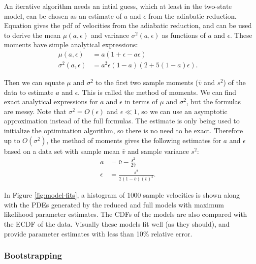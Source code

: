 An iterative algorithm needs an intial guess, which at least in the
two-state model, can be chosen as an estimate of $a$ and $\epsilon$
from the adiabatic reduction. Equation  gives the
pdf of velocities from the adiabatic reduction, and can be used to
derive the mean $\mu(a, \epsilon)$ and variance $\sigma^2(a,
\epsilon)$ as functions of $a$ and $\epsilon$. These moments have
simple analytical expressions: 
\begin{align}
  \label{eq:mean-ar}
  \mu(a, \epsilon) &= a(1 + \epsilon - a \epsilon) \\
  \label{eq:var-ar}
  \sigma^2(a, \epsilon) &= a^2 \epsilon (1 - a) (2 + 5(1 - a) \epsilon).
\end{align}

Then we can equate $\mu$ and $\sigma^2$ to the first two sample
moments ($\bar{v}$ and $s^2$) of the data to estimate $a$ and
$\epsilon$. This is called the method of moments. We can find exact
analytical expressions for $a$ and $\epsilon$ in terms of $\mu$ and
$\sigma^2$, but the formulas are messy. Note that
$\sigma^2 = O(\epsilon)$ and $\epsilon \ll 1$, so we can use an
asymptotic approximation instead of the full formulas. The estimate is
only being used to initialize the optimization algorithm, so there is
no need to be exact. Therefore up to $O(\sigma^2)$, the method of
moments gives the following estimates for $a$ and $\epsilon$ based on
a data set with sample mean $\bar{v}$ and sample variance $s^2$:
\begin{align}
  \label{eq:mean-est}
  a &= \bar{v} - \frac{s^2}{2\bar{v}} \\
  \label{eq:var-est}
  \epsilon &= \frac{s^2}{2(1 - \bar{v})(\bar{v})^2}.
\end{align}

In Figure \ref{fig:model-fits}, a histogram of 1000 sample velocities
is shown along with the PDEs generated by the reduced and full models
with maximum likelihood parameter estimates. The CDFs of the models
are also compared with the ECDF of the data. Visually these models fit
well (as they should), and provide parameter estimates with less than
10\% relative error.

\subsubsection{Bootstrapping}
\label{sec:bootstrapping}

